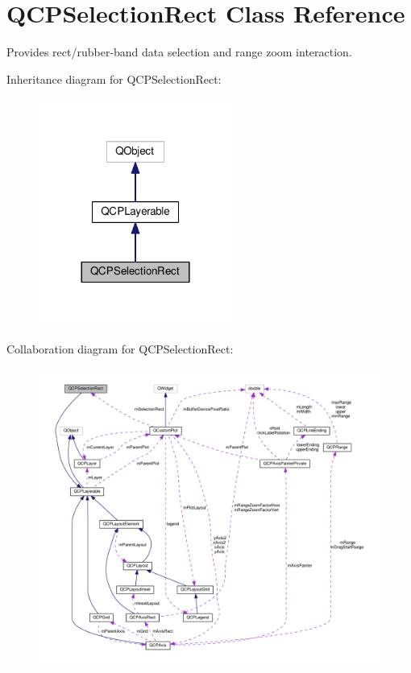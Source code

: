 \hypertarget{classQCPSelectionRect}{}\section{Q\+C\+P\+Selection\+Rect Class Reference}
\label{classQCPSelectionRect}


Provides rect/rubber-\/band data selection and range zoom interaction.  




Inheritance diagram for Q\+C\+P\+Selection\+Rect\+:
\nopagebreak
\begin{figure}[H]
\begin{center}
\leavevmode
\includegraphics[width=180pt]{classQCPSelectionRect__inherit__graph}
\end{center}
\end{figure}


Collaboration diagram for Q\+C\+P\+Selection\+Rect\+:
\nopagebreak
\begin{figure}[H]
\begin{center}
\leavevmode
\includegraphics[width=350pt]{classQCPSelectionRect__coll__graph}
\end{center}
\end{figure}
